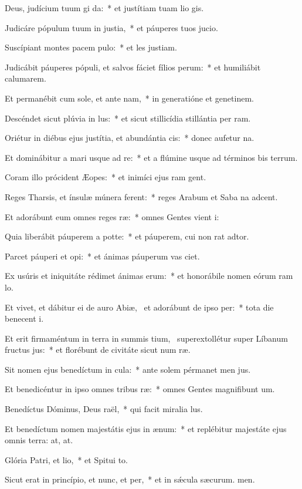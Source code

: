 \item Deus, judícium tuum gi da:~* et justítiam tuam lio gis.
\item Judicáre pópulum tuum in justia,~* et páuperes tuos  jucio.
\item Suscípiant montes pacem pulo:~* et les justiam.
\item Judicábit páuperes pópuli, et salvos fáciet fílios perum:~* et humiliábit calumarem.
\item Et permanébit cum sole, et ante nam,~* in generatióne et genetinem.
\item Descéndet sicut plúvia in lus:~* et sicut stillicídia stillántia per ram.
\item Oriétur in diébus ejus justítia, et abundántia cis:~* donec aufetur na.
\item Et dominábitur a mari usque ad re:~* et a flúmine usque ad términos bis terrum.
\item Coram illo prócident Æopes:~* et inimíci ejus ram gent.
\item Reges Tharsis, et ínsulæ múnera ferent:~* reges Arabum et Saba na adcent.
\item Et adorábunt eum omnes reges ræ:~* omnes Gentes vient i:
\item Quia liberábit páuperem a potte:~* et páuperem, cui non rat adtor.
\item Parcet páuperi et opi:~* et ánimas páuperum vas ciet.
\item Ex usúris et iniquitáte rédimet ánimas erum:~* et honorábile nomen eórum ram lo.
\item Et vivet, et dábitur ei de auro Abiæ,~\pscross{} et adorábunt de ipso per:~* tota die benecent i.
\item Et erit firmaméntum in terra in summis tium,~\pscross{} superextollétur super Líbanum fructus jus:~* et florébunt de civitáte sicut num ræ.
\item Sit nomen ejus benedíctum in cula:~* ante solem pérmanet men jus.
\item Et benedicéntur in ipso omnes tribus ræ:~* omnes Gentes magnifibunt um.
\item Benedíctus Dóminus, Deus raël,~* qui facit miralia lus.
\item Et benedíctum nomen majestátis ejus in ænum:~* et replébitur majestáte ejus omnis terra: at, at.
\item Glória Patri, et lio,~* et Spitui to.
\item Sicut erat in princípio, et nunc, et per,~* et in sǽcula sæcurum. men.
